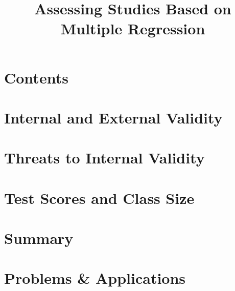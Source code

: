 \title[Assessing]{Assessing Studies Based on Multiple Regression}
\date{}




\section{Contents}

\section{Internal and External Validity}

\section{Threats to Internal Validity}

\section{Test Scores and Class Size}

\section{Summary}

\section{Problems \& Applications}

  
